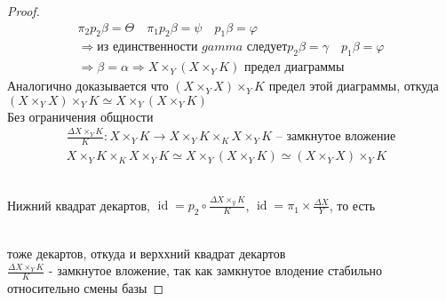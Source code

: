 \begin{proof}
\begin{gather*}
    \pi_2 p_2 \beta = \Theta\quad \pi_1 p_2 \beta = \psi\quad p_1 \beta = \varphi\\
    \Rightarrow \text{из единственности $gamma$ следует} p_2 \beta = \gamma \quad p_1 \beta = \varphi\\
    \Rightarrow \beta = \alpha
    \Rightarrow X \times_Y (X \times_Y K) \text{ предел диаграммы}
\end{gather*}
Аналогично доказывается что $(X \times_Y X) \times_Y K$ предел этой диаграммы, откуда $(X \times_Y X) \times_Y K \simeq X \times_Y (X \times_Y K)$\\
Без ограничения общности
\begin{gather*}
    \frac{\Delta X \times_Y K}{K}: X \times_Y K \to X \times_Y K \times_K X \times_Y K \text{ -- замкнутое вложение}\\
    X \times_Y K \times_K X \times_Y K \simeq X \times_Y (X \times_Y K) \simeq (X \times_Y X) \times_Y K
\end{gather*}

\\
Нижний квадрат декартов, $\operatorname{id} = p_2 \circ \frac{\Delta X \times_y K}{K}$, $\operatorname{id} = \pi_1 \times \frac{\Delta X}{Y}$, то есть\\
\\
 тоже декартов, откуда и верххний квадрат декартов\\
 $\frac{\Delta X \times_Y K}{K}$ - замкнутое вложение, так как замкнутое влодение стабильно относительно смены базы
\end{proof}
\begin{comment}
\end{comment}
\vskip 0.6in





